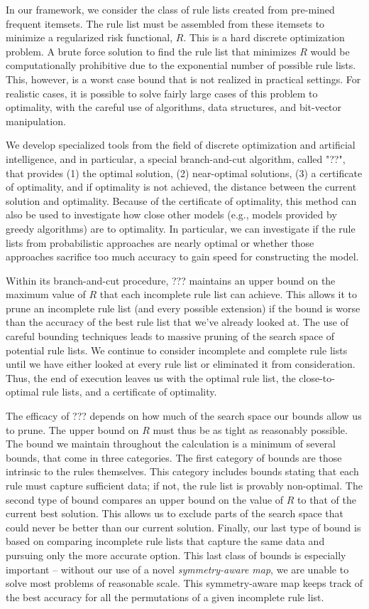 \documentclass[aoas,preprint]{imsart}
\begin{document}
In our framework, we consider the class of rule lists created from pre-mined frequent itemsets. The rule list must be assembled from these itemsets to minimize a regularized risk functional, $R$. This is a hard discrete optimization problem. A brute force solution to find the rule list that minimizes $R$ would be computationally prohibitive due to the exponential number of possible rule lists. This, however, is a worst case bound that is not realized in practical settings. For realistic cases, it is possible to solve fairly large cases of this problem to optimality, with the careful use of algorithms, data structures, and bit-vector manipulation.

We develop specialized tools from the field of discrete optimization and artificial intelligence, and in particular, a special branch-and-cut algorithm, called "??", that provides (1) the optimal solution, (2) near-optimal solutions, (3) a certificate of optimality, and if optimality is not achieved, the distance between the current solution and optimality. Because of the certificate of optimality, this method can also be used to investigate how close other models (e.g., models provided by greedy algorithms) are to optimality. In particular, we can investigate if the rule lists from probabilistic approaches are nearly optimal or whether those approaches sacrifice too much accuracy to gain speed for constructing the model.

Within its branch-and-cut procedure, ??? maintains an upper bound on the maximum value of $R$ that each incomplete rule list can achieve. This allows it to prune an incomplete rule list (and every possible extension) if the bound is worse than the accuracy of the best rule list that we've already looked at. The use of careful bounding techniques leads to massive pruning of the search space of potential rule lists. We continue to consider incomplete and complete rule lists until we have either looked at every rule list or eliminated it from consideration. Thus, the end of execution leaves us with the optimal rule list, the close-to-optimal rule lists, and a certificate of optimality.

The efficacy of ??? depends on how much of the search space our bounds allow us to prune. The upper bound on $R$ must thus be as tight as reasonably possible. The bound we maintain throughout the calculation is a minimum of several bounds, that come in three categories. The first category of bounds are those intrinsic to the rules themselves. This category includes bounds stating that each rule must capture sufficient data; if not, the rule list is provably non-optimal. The second type of bound compares an upper bound on the value of $R$ to that of the current best solution. This allows us to exclude parts of the search space that could never be better than our current solution. Finally, our last type of bound is based on comparing incomplete rule lists that capture the same data and pursuing only the more accurate option. This last class of bounds is especially important -- without our use of a novel \textit{symmetry-aware map}, we are unable to solve most problems of reasonable scale. This symmetry-aware map keeps track of the best accuracy for all the permutations of a given incomplete rule list.
\end{document}

